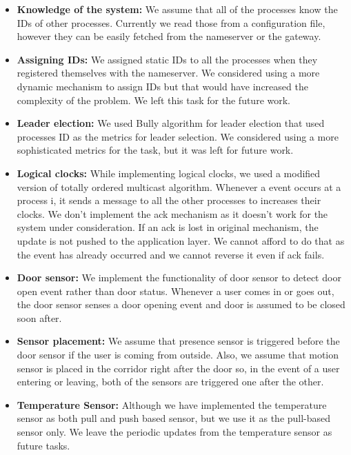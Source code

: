 \documentclass[12pt]{article}
\begin{document}
\begin{itemize}
		\item \textbf{Knowledge of the system:} We assume that all of the processes know the 
		IDs of other processes. Currently we read those from a configuration file, however they 
		can be easily fetched from the nameserver or the gateway.
	
		\item \textbf{Assigning IDs:} We assigned static IDs to all the processes when they registered themselves with 
		the nameserver. We considered using a more dynamic mechanism to assign IDs but that
		would have increased the complexity of the problem. We left this task for the future work.
		
		\item \textbf{Leader election:} We used Bully algorithm for leader election that used processes ID as the metrics for leader selection. We considered using a more sophisticated metrics for the task, but it was left for future work. 
		
		\item \textbf{Logical clocks:} While implementing logical clocks, we used a modified version of totally ordered 
		multicast algorithm. Whenever a event occurs at a process i, it sends a message to 
		all the other processes to increases their clocks. We don't implement the ack mechanism 
		as it doesn't work for the system under consideration. If an ack is lost in original mechanism, the update is not pushed to the application layer. We cannot afford to do that 
		as the event has already occurred and we cannot reverse it even if ack fails. 
		
		\item \textbf{Door sensor:} We implement the functionality of door sensor to detect door 
		open event rather than door status. Whenever a user comes in or goes out, the door  sensor senses a door opening event and door is assumed to be closed soon after. 
		
		\item \textbf{Sensor placement:} We assume that presence sensor is triggered before the 
		door sensor if the user is coming from outside. Also, we assume that motion sensor is placed in the corridor right after the door so, in the event of a user entering or leaving, 
		both of the sensors are triggered one after the other. 
		
		\item \textbf{Temperature Sensor:} Although we have implemented the temperature sensor
		as both pull and push based sensor, but we use it as the pull-based sensor only. We leave 
		the periodic updates from the temperature sensor as future tasks.  
		
\end{itemize}
\end{document}
